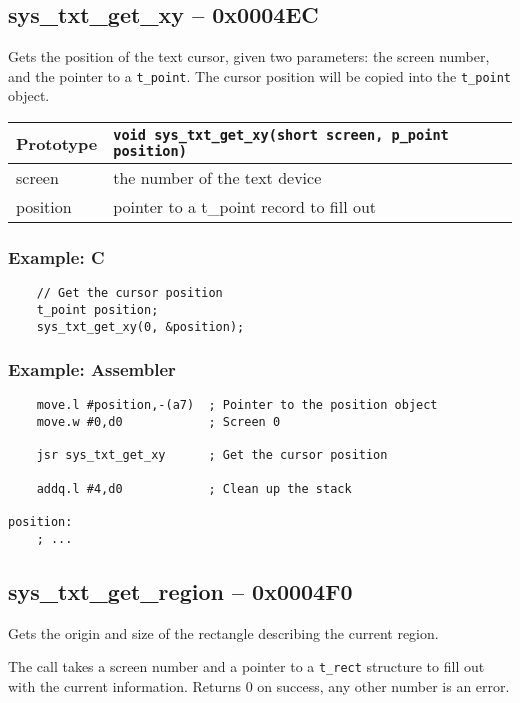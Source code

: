 \subsection*{sys\_txt\_get\_xy -- 0x0004EC}
Gets the position of the text cursor, given two parameters: the screen number, and the pointer to a \verb+t_point+.
The cursor position will be copied into the \verb+t_point+ object.

\bigskip

\begin{tabular}{|l||l|} \hline
Prototype & \lstinline!void sys_txt_get_xy(short screen, p_point position)! \\ \hline
screen & the number of the text device \\ \hline
position & pointer to a t\_point record to fill out \\ \hline
\end{tabular}

\subsubsection*{Example: C}
\begin{lstlisting}
    // Get the cursor position
    t_point position;
    sys_txt_get_xy(0, &position);
\end{lstlisting}

\subsubsection*{Example: Assembler}
\begin{verbatim}
    move.l #position,-(a7)  ; Pointer to the position object
    move.w #0,d0            ; Screen 0

    jsr sys_txt_get_xy      ; Get the cursor position

    addq.l #4,d0            ; Clean up the stack

position:
    ; ...
\end{verbatim}


\subsection*{sys\_txt\_get\_region -- 0x0004F0}
Gets the origin and size of the rectangle describing the current region.

The call takes a screen number and a pointer to a \verb+t_rect+ structure to fill out with the current information.
Returns 0 on success, any other number is an error.

